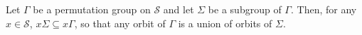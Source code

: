 Let $\Gamma$ be a permutation group on $\mathcal{S}$ and let $\Sigma$ be a subgroup of $\Gamma$. Then, for any $x \in \mathcal{S}$, $x\Sigma \subseteq x\Gamma$, so that any orbit of $\Gamma$ is a union of orbits of $\Sigma$.
